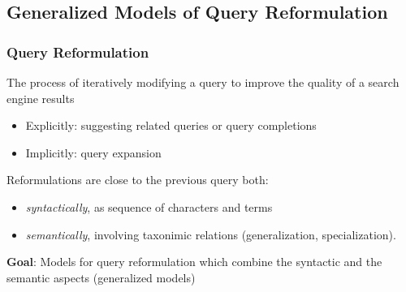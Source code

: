 \subsection{Generalized Models of Query Reformulation}

\begin{frame}
	\frametitle{Query Reformulation}
	\begin{block}
	 {The process of iteratively modifying a query to improve
the quality of a search engine results}
	\end{block}
	\begin{itemize}	
	 \item Explicitly: suggesting related queries or query completions
	 \item Implicitly: query expansion
	\end{itemize}
	\vskip5pt
	Reformulations are close to the previous query both:
	\begin{itemize}
	 \item \textit{syntactically}, as sequence of characters and terms
	 \item \textit{semantically}, involving taxonimic relations (generalization, specialization).
	\end{itemize}
	\textbf{Goal}: Models for query reformulation which combine the syntactic and
the semantic aspects (generalized models)

\end{frame}

